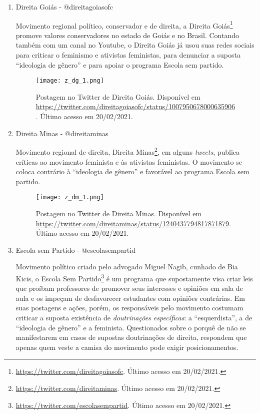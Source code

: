 \documentclass[
	12pt,				%
	openright,			%
	twoside,			%
	a4paper,			%
	english,			%
	brazil				%
	]{abntex2}
\begin{document}
\begin{anexosenv}
\begin{enumerate}
 \begin{figure}[!htbp]
    \centering
    \texttt{[image: cnac\_2.png]}
    \caption{Postagem no Twitter de Crítica Nacional. Disponível em \url{https://twitter.com/criticanac/status/736275813121675265}. Último acesso em 20/02/2021.}
 \end{figure}
 
  \newpage
  
 \item Direita Goiás - @direitagoiasofc
 
 Movimento regional político, conservador e de direita, a Direita Goiás\footnote{\url{https://twitter.com/direitagoiasofc}. Último acesso em 20/02/2021.} promove valores conservadores no estado de Goiás e no Brasil. Contando também com um canal no Youtube, o Direita Goiás já usou suas redes sociais para criticar o feminismo e ativistas feministas, para denunciar a suposta ``ideologia de gênero'' e para apoiar o programa Escola sem partido.
 
 \begin{figure}[!htbp]
    \centering
    \texttt{[image: z\_dg\_1.png]}
    \caption{Postagem no Twitter de Direita Goiás. Disponível em \url{https://twitter.com/direitagoiasofc/status/1007950678000635906}. Último acesso em 20/02/2021.}
 \end{figure}
  
 \item Direita Minas - @direitaminas\label{dirmin}
 
 Movimento regional de direita, Direita Minas\footnote{\url{https://twitter.com/direitaminas}. Último acesso em 20/02/2021.}, em alguns \textit{tweets}, publica críticas ao movimento feminista e às ativistas feministas. O movimento se coloca contrário à ``ideologia de gênero'' e favorável ao programa Escola sem partido.
 
 \begin{figure}[!htbp]
    \centering
    \texttt{[image: z\_dm\_1.png]}
    \caption{Postagem no Twitter de Direita Minas. Disponível em \url{https://twitter.com/direitaminas/status/1240437794817871879}. Último acesso em 20/02/2021.}
 \end{figure}
 
  \newpage
  
 \item Escola sem Partido - @escolasempartid
 
 Movimento político criado pelo advogado Miguel Nagib, cunhado de Bia Kicis, o Escola Sem Partido\footnote{\url{https://twitter.com/escolasempartid}. Último acesso em 20/02/2021.} é um programa que supostamente visa criar leis que proíbam professores de promover seus interesses e opiniões em sala de aula e os impeçam de desfavorecer estudantes com opiniões contrárias. Em suas postagens e ações, porém, os responsáveis pelo movimento costumam criticar a suposta existência de \textit{doutrinações específicas}: a ``esquerdista'', a de ``ideologia de gênero'' e a feminista. Questionados sobre o porquê de não se manifestarem em casos de supostas doutrinações de direita, respondem que apenas quem veste a camisa do movimento pode exigir posicionamentos.
 

\end{enumerate}
\end{anexosenv}
\end{document}
